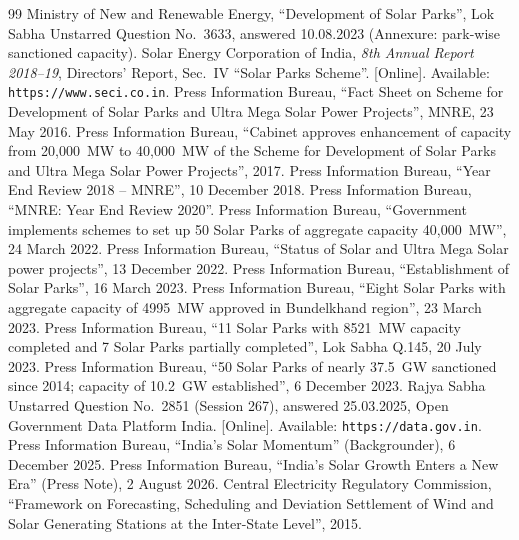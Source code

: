 \documentclass[12pt]{report}
\begin{document}
\clearpage
{}
\begingroup
\small
\begin{thebibliography}{99}
\setlength{\itemsep}{0pt}\setlength{\parsep}{0pt}
 Ministry of New and Renewable Energy, ``Development of Solar Parks'', Lok Sabha Unstarred Question No.~3633, answered 10.08.2023 (Annexure: park-wise sanctioned capacity).
 Solar Energy Corporation of India, \textit{8th Annual Report 2018--19}, Directors' Report, Sec.~IV ``Solar Parks Scheme''. [Online]. Available: \texttt{https://www.seci.co.in}.
 Press Information Bureau, ``Fact Sheet on Scheme for Development of Solar Parks and Ultra Mega Solar Power Projects'', MNRE, 23 May 2016.
 Press Information Bureau, ``Cabinet approves enhancement of capacity from 20,000~MW to 40,000~MW of the Scheme for Development of Solar Parks and Ultra Mega Solar Power Projects'', 2017.
 Press Information Bureau, ``Year End Review 2018 -- MNRE'', 10 December 2018.
 Press Information Bureau, ``MNRE: Year End Review 2020''.
 Press Information Bureau, ``Government implements schemes to set up 50 Solar Parks of aggregate capacity 40,000~MW'', 24 March 2022.
 Press Information Bureau, ``Status of Solar and Ultra Mega Solar power projects'', 13 December 2022.
 Press Information Bureau, ``Establishment of Solar Parks'', 16 March 2023.
 Press Information Bureau, ``Eight Solar Parks with aggregate capacity of 4995~MW approved in Bundelkhand region'', 23 March 2023.
 Press Information Bureau, ``11 Solar Parks with 8521~MW capacity completed and 7 Solar Parks partially completed'', Lok Sabha Q.145, 20 July 2023.
 Press Information Bureau, ``50 Solar Parks of nearly 37.5~GW sanctioned since 2014; capacity of 10.2~GW established'', 6 December 2023.
 Rajya Sabha Unstarred Question No.~2851 (Session 267), answered 25.03.2025, Open Government Data Platform India. [Online]. Available: \texttt{https://data.gov.in}.
 Press Information Bureau, ``India's Solar Momentum'' (Backgrounder), 6 December 2025.
 Press Information Bureau, ``India's Solar Growth Enters a New Era'' (Press Note), 2 August 2026.
 Central Electricity Regulatory Commission, ``Framework on Forecasting, Scheduling and Deviation Settlement of Wind and Solar Generating Stations at the Inter-State Level'', 2015.

\end{thebibliography}
\end{document}
